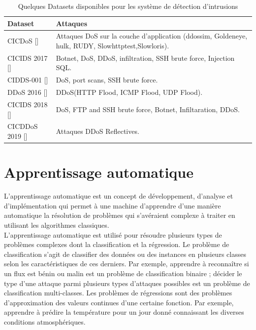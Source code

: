 \begin{table}[h]
\begin{center}
\begin{tabular}{   m{4cm} | m{10cm}  }
\textbf{Dataset} & \textbf{Attaques}\\
\hline
\rowcolor[rgb]{0.85,0.85,0.85}
CICDoS [\cite{16}]  & Attaques DoS sur la couche d'application (ddossim, Goldeneye, hulk, RUDY, Slowhttptest,Slowloris).\\
\hline
CICIDS 2017 [\cite{17}] & Botnet, DoS, DDoS, infiltration, SSH brute force, Injection SQL.\\
\hline
\rowcolor[rgb]{0.85,0.85,0.85}
CIDDS-001 [\cite{18}] & DoS, port scans, SSH brute force.\\
\hline
DDoS 2016 [\cite{19}] & DDoS(HTTP Flood, ICMP Flood, UDP Flood).\\
\hline 
\rowcolor[rgb]{0.85,0.85,0.85}
CICIDS 2018 [\cite{20}] & DoS, FTP and SSH brute force, Botnet, Infiltaration, DDoS.\\
\hline
CICDDoS 2019 [\cite{21}] & Attaques DDoS Reflectives.\\
\hline
\end{tabular}
\caption{Quelques Datasets disponibles pour les système de détection d'intrusions}
\end{center}
\label{table:Datasets}
\end{table}


\newpage
\section{Apprentissage automatique}
L’apprentissage automatique est un concept de développement, d’analyse et d’implémentation qui permet à une machine d’apprendre d’une manière automatique la résolution de problèmes qui s’avéraient complexe à traiter en utilisant les algorithmes classiques.\\

\noindent L’apprentissage automatique est utilisé pour résoudre plusieurs types de problèmes complexes dont la classification et la régression. Le problème de classification s’agit de classifier des données ou des instances en plusieurs classes selon les caractéristiques de ces derniers. Par exemple, apprendre à reconnaître si un flux est bénin ou malin est un problème de classification binaire ; décider le type d’une attaque parmi plusieurs types d’attaques possibles est un problème de classification multi-classes. Les problèmes de régressions sont des problèmes d’approximation des valeurs continues d’une certaine fonction. Par exemple, apprendre à prédire la température pour un jour donné connaissant les diverses conditions atmosphériques.\\

